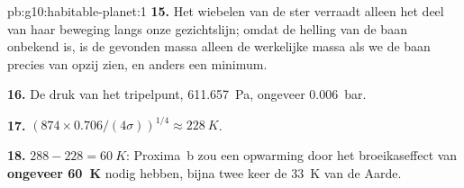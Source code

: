 \begin{solution}{pb:g10:habitable-planet:1}
\textbf{15.} Het wiebelen van de ster verraadt alleen het deel van haar
beweging langs onze gezichtslijn; omdat de helling van de baan onbekend is, is
de gevonden massa alleen de werkelijke massa als we de baan precies van opzij
zien, en anders een minimum.

\textbf{16.} De druk van het tripelpunt, \qty{611.657}{Pa}, ongeveer
\qty{0.006}{bar}.

\textbf{17.} $(874 \times 0.706/(4\sigma))^{1/4} \approx \qty{228}{K}$.

\textbf{18.} $288 - 228 = \qty{60}{K}$: Proxima~b zou een opwarming door het
broeikaseffect van \textbf{ongeveer \qty{60}{K}} nodig hebben, bijna twee keer
de \qty{33}{K} van de Aarde.
\end{solution}
